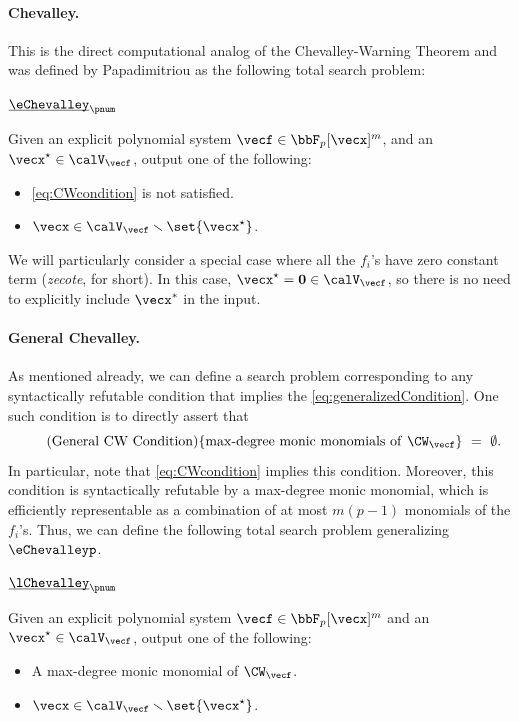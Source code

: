 \paragraph{Chevalley.}
  This is the direct computational analog of the Chevalley-Warning Theorem and was
defined by Papadimitriou \cite{r33} as the following total
search problem:
\medskip

\noindent $\underbar{\eChevalley}_{\pnum}$

\noindent Given an explicit polynomial system $\vecf \in \bbF_p[\vecx]^m$, and an
$\vecx^{\star} \in \calV_{\vecf}$, output one of the following:\vspace*{-0.8mm}
\begin{itemize}
	\item[$\triangleright$] [{\em Refuting witness}] \eqref{eq:CWcondition} is not satisfied.
	\item[$\triangleright$] $\vecx \in \calV_{\vecf} \smallsetminus \set{\vecx^{\star}}$.
\end{itemize}

\noindent We will particularly consider a special case where all the $f_i$'s have zero constant term
({\em zecote}, for short). In this case, $\vecx^{\star} = \mathbf{0} \in \calV_{\vecf}$, so there is no need to explicitly include $\vecx^*$ in the input.

\paragraph{General Chevalley.} As mentioned already, we can define a search problem corresponding to any syntactically refutable condition that implies the
\eqref{eq:generalizedCondition}. One such condition is to directly assert that\vspace{-2.5mm}
\begin{equation}
	\tag{General CW Condition}
	\{\mathrm{max\text{-}degree~monic~monomials~of~} \CW_{\vecf}\} ~=~ \emptyset. \label{eq:generalCWCondition}
\end{equation}
In particular, note that \eqref{eq:CWcondition} implies this condition. Moreover, this condition is syntactically refutable by a max-degree monic monomial, which is efficiently representable as a combination of at most $m(p-1)$ monomials of the $f_i$'s. Thus, we can define the following total search problem generalizing $\eChevalleyp$.\medskip

\noindent $\underbar{\lChevalley}_{\pnum}$

\noindent Given an explicit polynomial system $\vecf \in \bbF_p[\vecx]^m$ and an
$\vecx^{\star} \in \calV_{\vecf}$, output one of the following:\vspace{-0.5mm}
\begin{itemize}
	\item[$\triangleright$] [{\em Refuting Witness}] A max-degree monic monomial of $\CW_{\vecf}$.
	\item[$\triangleright$] $\vecx \in \calV_{\vecf} \smallsetminus \set{\vecx^{\star}}$.
\end{itemize}
\medskip

